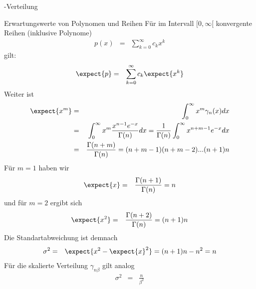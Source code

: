 \begin{chapter}{\titlestr}
\begin{appendix}
\begin{section}{\titlemath{$\Gamma$}-Verteilung}
\begin{subsection}{Erwartungswerte von Polynomen und Reihen}
Für im Intervall $[0,\infty[$ konvergente Reihen (inklusive Polynome)
\begin{eqnarray*}
p(x) &=& \sum_{k=0}^\infty c_kx^k
\end{eqnarray*}
gilt:
\begin{eqnarray*}
\expect{p} &=& \sum_{k=0}^\infty c_k\expect{x^k}
\end{eqnarray*}
Weiter ist
\begin{eqnarray*}
\expect{x^m} &=& \int_0^\infty x^m\gamma_n(x) dx\\
&=& \int_0^\infty x^m\frac{x^{n-1}e^{-x}}{\Gamma(n)} dx
=\frac{1}{\Gamma(n)}\int_0^\infty x^{n+m-1}e^{-x} dx\\
&=&\frac{\Gamma(n+m)}{\Gamma(n)} = (n+m-1)(n+m-2)...(n+1)n
\end{eqnarray*}
Für $m=1$ haben wir
\begin{eqnarray*}
\expect{x} &=& \frac{\Gamma(n+1)}{\Gamma(n)}=n
\end{eqnarray*}
und für $m=2$ ergibt sich
\begin{eqnarray*}
\expect{x^2} &=& \frac{\Gamma(n+2)}{\Gamma(n)}=(n+1)n
\end{eqnarray*}
Die Standartabweichung ist demnach
\begin{eqnarray*}
\sigma^2 &=& \expect{x^2-\expect{x}^2} = (n+1)n-n^2 = n
\end{eqnarray*}
Für die skalierte Verteilung $\gamma_{n\beta}$ gilt analog
\begin{eqnarray*}
\sigma^2 &=& \frac{n}{\beta^2}
\end{eqnarray*}
\end{subsection}


\end{section}
\end{appendix}
\end{chapter}
